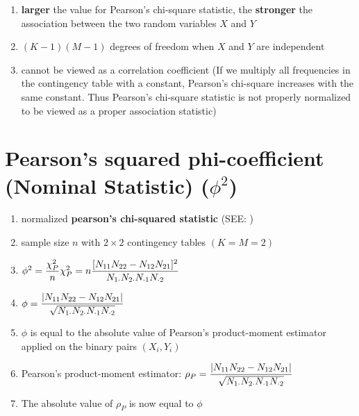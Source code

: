 \begin{enumerate}
    \item \textbf{larger} the value for Pearson’s chi-square statistic, the \textbf{stronger} the association between the two random variables $X$ and $Y$

    \item $(K - 1)(M - 1)$ degrees of freedom when $X$ and $Y$ are independent

    \item cannot be viewed as a correlation coefficient (If we multiply all frequencies in the contingency table with a constant, Pearson’s chi-square increases with the same constant. Thus Pearson’s chi-square statistic is not properly normalized to be viewed as a proper association statistic)

\end{enumerate}


\section{Pearson’s squared phi-coefficient (Nominal Statistic) ($\phi^2$) \cite{ism-1}} \label{Multivariate Distributions: Pearson’s squared phi-coefficient (Nominal Statistic)}

\begin{enumerate}
    \item normalized \textbf{pearson’s chi-squared statistic} (SEE: )

    \item sample size $n$ with $2 \times  2$ contingency tables $(K = M = 2)$

    \item $
        \hfill
        \phi^2 = \dfrac{\chi_P^2}{n}
        \hfill
        \chi_P^2 = n \dfrac{
            [N_{11}N_{22} - N_{12}N_{21}]^2
        }{
            N_{1\cdot}N_{2\cdot}N_{\cdot 1}N_{\cdot 2}
        }
        \hfill
    $

    \item $
        \hfill
        \phi = \dfrac{
            |N_{11}N_{22} - N_{12}N_{21}|
        }{
            \sqrt{N_{1\cdot}N_{2\cdot}N_{\cdot 1}N_{\cdot 2}}
        }
        \hfill
    $

    \item $\phi$ is equal to the absolute value of Pearson’s product-moment estimator applied on the binary pairs $(X_i, Y_i)$

    \item Pearson’s product-moment estimator: $
        \hfill
        \rho_P = \dfrac{
            |N_{11}N_{22} - N_{12}N_{21}|
        }{
            \sqrt{N_{1\cdot}N_{2\cdot}N_{\cdot 1}N_{\cdot 2}}
        }
        \hfill
    $

    \item The absolute value of $\rho_P$ is now equal to $\phi$
\end{enumerate}



